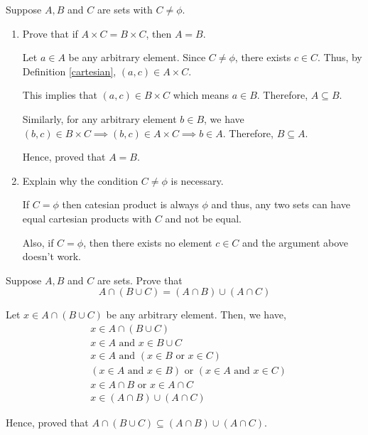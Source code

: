 \bp
Suppose $A, B$ and $C$ are sets with $C \neq \phi$.
\begin{enumerate}
	\item Prove that if $A \times C = B \times C$, then $A = B$.

	      \bs
	      Let $a \in A$ be any arbitrary element. Since $C \neq \phi$, there exists $c \in C$. Thus, by Definition \ref{cartesian}, $(a, c) \in A \times C$.

	      This implies that $(a, c) \in B \times C$ which means $a \in B$. Therefore, $A \subseteq B$.

	      Similarly, for any arbitrary element $b \in B$, we have $(b, c) \in B \times C \implies (b, c) \in A \times C \implies b \in A$. Therefore, $B \subseteq A$.

	      Hence, proved that $A = B$.
	      \es

	\item Explain why the condition $C \neq \phi$ is necessary.

	      \bs
	      If $C = \phi$ then catesian product is always $\phi$ and thus, any two sets can have equal cartesian products with $C$ and not be equal.

	      Also, if $C = \phi$, then there exists no element $c \in C$ and the argument above doesn't work.
	      \es

\end{enumerate}
\ep

\bp
Suppose $A, B$ and $C$ are sets. Prove that
$$A \cap (B \cup C) = (A \cap B) \cup (A \cap C)$$
\ep

\bs
Let $x \in A \cap (B \cup C)$ be any arbitrary element. Then, we have,
\begin{align}
	 & x \in A \cap (B \cup C)                                                   \\
	 & x \in A \text{ and } x \in B \cup C                                       \\
	 & x \in A \text{ and } ( x \in B \text{ or } x \in C )                      \\
	 & (x \in A \text{ and } x \in B) \text{ or } (x \in A \text{ and } x \in C) \\
	 & x \in A \cap B \text{ or } x \in A \cap C                                 \\
	 & x \in (A \cap B) \cup (A \cap C)
\end{align}

Hence, proved that $A \cap (B \cup C) \subseteq (A \cap B) \cup (A \cap C)$.


